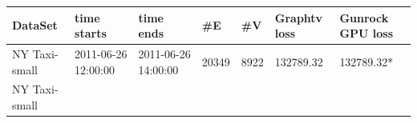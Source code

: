 \documentclass[10pt,oneside]{memoir}
\begin{document}
\begin{longtable}[]{@{}lllllll@{}}
\toprule
\begin{minipage}[b]{0.10\columnwidth}\raggedright
DataSet\strut
\end{minipage} & \begin{minipage}[b]{0.15\columnwidth}\raggedright
time starts\strut
\end{minipage} & \begin{minipage}[b]{0.14\columnwidth}\raggedright
time ends\strut
\end{minipage} & \begin{minipage}[b]{0.07\columnwidth}\raggedright
\#E\strut
\end{minipage} & \begin{minipage}[b]{0.07\columnwidth}\raggedright
\#V\strut
\end{minipage} & \begin{minipage}[b]{0.14\columnwidth}\raggedright
Graphtv loss\strut
\end{minipage} & \begin{minipage}[b]{0.14\columnwidth}\raggedright
Gunrock GPU loss\strut
\end{minipage}\tabularnewline
\midrule
\endhead
\begin{minipage}[t]{0.10\columnwidth}\raggedright
NY Taxi-small\strut
\end{minipage} & \begin{minipage}[t]{0.15\columnwidth}\raggedright
2011-06-26 12:00:00\strut
\end{minipage} & \begin{minipage}[t]{0.14\columnwidth}\raggedright
2011-06-26 14:00:00\strut
\end{minipage} & \begin{minipage}[t]{0.07\columnwidth}\raggedright
20349\strut
\end{minipage} & \begin{minipage}[t]{0.07\columnwidth}\raggedright
8922\strut
\end{minipage} & \begin{minipage}[t]{0.14\columnwidth}\raggedright
132789.32\strut
\end{minipage} & \begin{minipage}[t]{0.14\columnwidth}\raggedright
132789.32*\strut
\end{minipage}\tabularnewline
\begin{minipage}[t]{0.10\columnwidth}\raggedright
NY Taxi-small\strut
\end{minipage} & \begin{minipage}[t]{0.15\columnwidth}\raggedright

\end{minipage}
\end{longtable}
\end{document}
